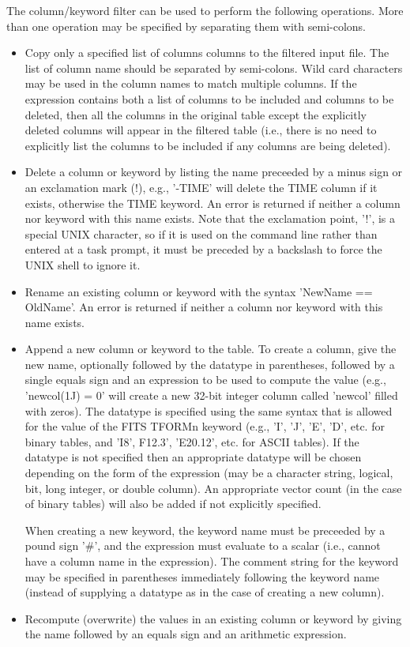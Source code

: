 \documentclass[11pt]{book}
\begin{document}
The column/keyword filter can be used to perform the following
operations.  More than one operation may be specified by separating
them with semi-colons.

\begin{itemize}

\item
Copy only a specified list of columns columns to the filtered input file.
The list of column name should be separated by semi-colons.  Wild card
characters may be used in the column names to match multiple columns.
If the expression contains both a list of columns to be included and
columns to be deleted, then all the columns in the original table
except the explicitly deleted columns will appear in the filtered
table (i.e., there is no need to explicitly list the columns to
be included if any columns are being deleted).

\item
Delete a column or keyword by listing the name preceeded by a minus
sign or an exclamation mark (!), e.g., '-TIME' will delete the TIME
column if it exists, otherwise the TIME keyword.  An error is returned
if neither a column nor keyword with this name exists.  Note  that the
exclamation point,  '!', is a special UNIX character, so if it is used
on the command line rather than entered at a task prompt, it must be
preceded by a backslash to force the UNIX shell to ignore it.

\item
Rename an existing column or keyword with the syntax 'NewName ==
OldName'.  An error is returned if neither a column nor keyword with
this name exists.

\item
Append a new column or keyword to the table.  To create a column,
give the new name, optionally followed by the datatype in parentheses,
followed by a single equals sign and an  expression to be used to
compute the value (e.g., 'newcol(1J) = 0' will create a new 32-bit
integer column called 'newcol' filled with zeros).  The datatype is
specified using the same syntax that is allowed for the value of the
FITS TFORMn keyword (e.g., 'I', 'J', 'E', 'D', etc. for binary tables,
and 'I8', F12.3', 'E20.12', etc. for ASCII tables).  If the datatype is
not specified then an appropriate datatype will be chosen depending on
the form of the expression (may be a character string, logical, bit, long
integer, or double column). An appropriate vector count (in the case
of binary tables) will also be added if not explicitly specified.

When creating a new keyword, the keyword name must be preceeded by a
pound sign '\#', and the expression must evaluate to a scalar
(i.e., cannot have a column name in the expression).  The comment
string for the keyword may be specified in parentheses immediately
following the keyword name (instead of supplying a datatype as in
the case of creating a new column).

\item
Recompute (overwrite) the values in an existing column or keyword by
giving the name followed by an equals sign and an arithmetic
expression.
\end{itemize}
\end{document}
